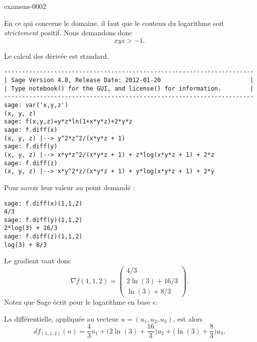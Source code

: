 

\begin{corrige}{examens-0002}

    En ce qui concerne le domaine, il faut que le contenu du logarithme soit \emph{strictement} positif. Nous demandons donc
    \begin{equation}
        xyz>-1.
    \end{equation}

    Le calcul des dérivée est standard. 
    \begin{verbatim}
----------------------------------------------------------------------
| Sage Version 4.8, Release Date: 2012-01-20                         |
| Type notebook() for the GUI, and license() for information.        |
----------------------------------------------------------------------
sage: var('x,y,z')
(x, y, z)
sage: f(x,y,z)=y*z*ln(1+x*y*z)+2*y*z
sage: f.diff(x)
(x, y, z) |--> y^2*z^2/(x*y*z + 1)
sage: f.diff(y)
(x, y, z) |--> x*y*z^2/(x*y*z + 1) + z*log(x*y*z + 1) + 2*z
sage: f.diff(z)
(x, y, z) |--> x*y^2*z/(x*y*z + 1) + y*log(x*y*z + 1) + 2*y
    \end{verbatim}

Pour savoir leur valeur au point demandé :

    \begin{verbatim}
sage: f.diff(x)(1,1,2)         
4/3
sage: f.diff(y)(1,1,2)
2*log(3) + 16/3
sage: f.diff(z)(1,1,2)
log(3) + 8/3
    \end{verbatim}
    

    Le gradient vaut donc
    \begin{equation}
        \nabla f(1,1,2)=\begin{pmatrix}
            4/3\\ 
            2\ln(3)+16/3    \\ 
            \ln(3)+8/3    
        \end{pmatrix}.
    \end{equation}
    Notez que Sage écrit  pour le logarithme en base \( e\).

    La différentielle, appliquée au vecteur \( u=(u_1,u_2,u_3)\), est alors
    \begin{equation}
        df_{(1,1,2)}(u)=\frac{ 4 }{ 3 }u_1+\big( 2\ln(3)+\frac{ 16 }{ 3 } \big)u_2+\big( \ln(3)+\frac{ 8 }{ 3 } \big)u_3.
    \end{equation}
    
\end{corrige}
